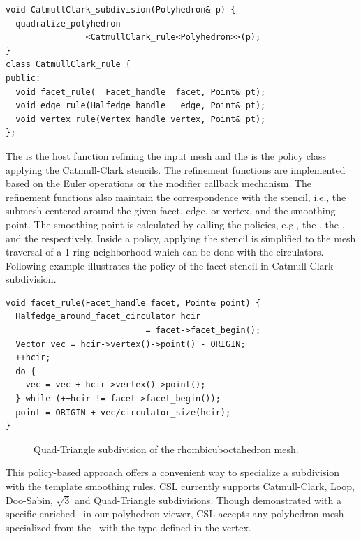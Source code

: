 \documentclass[twocolumn]{article}
\begin{document}
\begin{lstlisting}
void CatmullClark_subdivision(Polyhedron& p) {    
  quadralize_polyhedron
                <CatmullClark_rule<Polyhedron>>(p);  
}
class CatmullClark_rule {
public:
  void facet_rule(  Facet_handle  facet, Point& pt);
  void edge_rule(Halfedge_handle   edge, Point& pt);
  void vertex_rule(Vertex_handle vertex, Point& pt);
};
\end{lstlisting}
\noindent The  
is the host function refining the input mesh
and the  is the policy 
class applying the Catmull-Clark stencils.
The refinement functions are implemented based on the
Euler operations or the modifier callback mechanism.
The refinement functions also maintain the 
correspondence with the stencil, i.e., the submesh 
centered around the given facet, edge, or
vertex, and the smoothing point.
The smoothing point is calculated by calling the 
policies, e.g., the , the 
, and the  
respectively. Inside a policy, applying the 
stencil is simplified to the mesh traversal of a 
1-ring neighborhood which can be done with the 
circulators. Following example illustrates  
the policy of the facet-stencil in Catmull-Clark 
subdivision.
\begin{lstlisting}
void facet_rule(Facet_handle facet, Point& point) {
  Halfedge_around_facet_circulator hcir 
                            = facet->facet_begin();
  Vector vec = hcir->vertex()->point() - ORIGIN;
  ++hcir;
  do {
    vec = vec + hcir->vertex()->point();
  } while (++hcir != facet->facet_begin());
  point = ORIGIN + vec/circulator_size(hcir);
}
\end{lstlisting}

\begin{figure}[h]
    \caption{Quad-Triangle subdivision of the rhombicuboctahedron mesh.}
    \label{fig:quad-triangle}
\end{figure}

This policy-based approach offers a convenient way to
specialize a subdivision with the template smoothing rules.
CSL currently supports Catmull-Clark, 
Loop, Doo-Sabin, $\sqrt{3}$ and Quad-Triangle
subdivisions. %
Though demonstrated with a specific enriched \poly\ in our 
polyhedron viewer, CSL accepts any polyhedron mesh specialized 
from the \poly\ with the  type defined in the vertex.  



{\footnotesize


}
\end{document}
